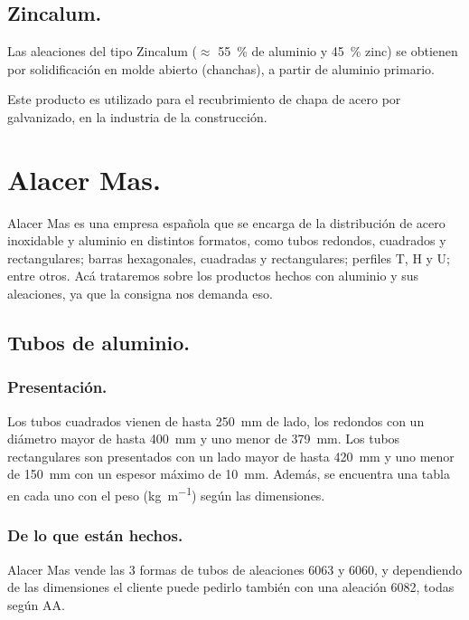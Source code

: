\documentclass[12pt,a4paper]{article}
\begin{document}
\subsection{Zincalum.}

Las aleaciones del tipo Zincalum ($\approx$ \SI{55}{\percent} de aluminio y \SI{45}{\percent} zinc) se obtienen por solidificación en molde abierto (chanchas), a partir de aluminio primario.

Este producto es utilizado para el recubrimiento de chapa de acero por galvanizado, en la industria de la construcción.

\section{Alacer Mas.}
 
Alacer Mas es una empresa española que se encarga de la distribución de acero inoxidable y aluminio en distintos formatos, como tubos redondos, cuadrados y rectangulares; barras hexagonales, cuadradas y rectangulares; perfiles T, H y U; entre otros. Acá trataremos sobre los productos hechos con aluminio y sus aleaciones, ya que la consigna nos demanda eso.

\subsection{Tubos de aluminio.}

\subsubsection{Presentación.}

Los tubos cuadrados vienen de hasta \SI{250}{\milli\metre} de lado, los redondos con un diámetro mayor de hasta \SI{400}{\milli\metre} y uno menor de \SI{379}{\milli\metre}. Los tubos rectangulares son presentados con un lado mayor de hasta \SI{420}{\milli\metre} y uno menor de \SI{150}{\milli\metre} con un espesor máximo de \SI{10}{\milli\metre}. Además, se encuentra una tabla en cada uno con el peso (\si{\kilogram\per\metre}) según las dimensiones.

\subsubsection{De lo que están hechos.}

Alacer Mas vende las 3 formas de tubos de aleaciones 6063 y 6060, y dependiendo de las dimensiones el cliente puede pedirlo también con una aleación 6082, todas según AA. 
\end{document}
